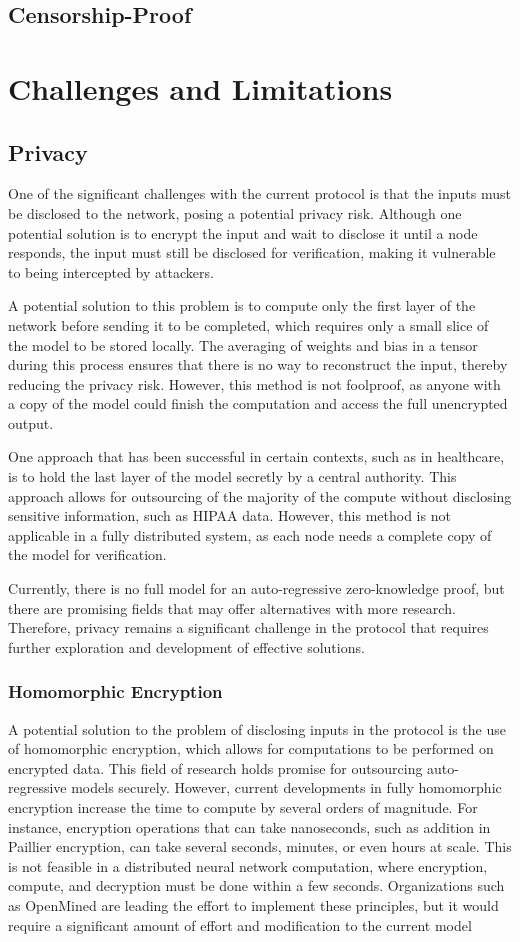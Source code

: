 \documentclass{article}
\begin{document}
\subsection{Censorship-Proof}

\section{Challenges and Limitations}
\subsection{Privacy}
One of the significant challenges with the current protocol is that the inputs must be disclosed to the network, posing a potential privacy risk. 
Although one potential solution is to encrypt the input and wait to disclose it until a node responds, the input must still be disclosed for verification, making it vulnerable to being intercepted by attackers.

A potential solution to this problem is to compute only the first layer of the network before sending it to be completed, which requires only a small slice of the model to be stored locally. 
The averaging of weights and bias in a tensor during this process ensures that there is no way to reconstruct the input, thereby reducing the privacy risk. 
However, this method is not foolproof, as anyone with a copy of the model could finish the computation and access the full unencrypted output.

One approach that has been successful in certain contexts, such as in healthcare, is to hold the last layer of the model secretly by a central authority. 
This approach allows for outsourcing of the majority of the compute without disclosing sensitive information, such as HIPAA data. 
However, this method is not applicable in a fully distributed system, as each node needs a complete copy of the model for verification.

Currently, there is no full model for an auto-regressive zero-knowledge proof, but there are promising fields that may offer alternatives with more research. 
Therefore, privacy remains a significant challenge in the protocol that requires further exploration and development of effective solutions.
\subsubsection{Homomorphic Encryption}
A potential solution to the problem of disclosing inputs in the protocol is the use of homomorphic encryption, which allows for computations to be performed on encrypted data. 
This field of research holds promise for outsourcing auto-regressive models securely. 
However, current developments in fully homomorphic encryption increase the time to compute by several orders of magnitude. 
For instance, encryption operations that can take nanoseconds, such as addition in Paillier encryption, can take several seconds, minutes, or even hours at scale. 
This is not feasible in a distributed neural network computation, where encryption, compute, and decryption must be done within a few seconds. 
Organizations such as OpenMined are leading the effort to implement these principles, but it would require a significant amount of effort and modification to the current model
\end{document}
